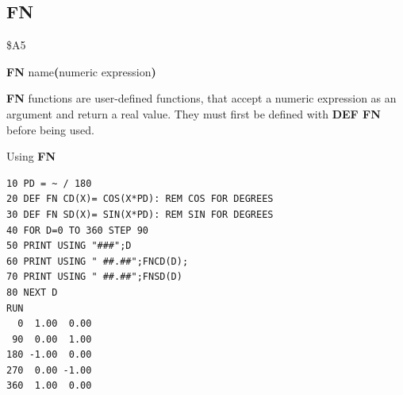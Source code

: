 
\newpage
\subsection{FN}
\begin{description}[leftmargin=2cm,style=nextline]
\item [Token:] \$A5
\item [Format:] {\bf FN} name{\bf(}numeric expression{\bf)}
\item [Usage:] {\bf FN} functions are user-defined
               functions, that accept a numeric expression as an
               argument and return a real value.
               They must first be defined with {\bf DEF FN} before
               being used.

\item [Example:] Using {\bf FN}
\begin{tcolorbox}[colback=black,coltext=white]
\verbatimfont{\codefont}
\begin{verbatim}
10 PD = ~ / 180
20 DEF FN CD(X)= COS(X*PD): REM COS FOR DEGREES
30 DEF FN SD(X)= SIN(X*PD): REM SIN FOR DEGREES
40 FOR D=0 TO 360 STEP 90
50 PRINT USING "###";D
60 PRINT USING " ##.##";FNCD(D);
70 PRINT USING " ##.##";FNSD(D)
80 NEXT D
RUN
  0  1.00  0.00
 90  0.00  1.00
180 -1.00  0.00
270  0.00 -1.00
360  1.00  0.00
\end{verbatim}
\end{tcolorbox}
\end{description}


\newpage
